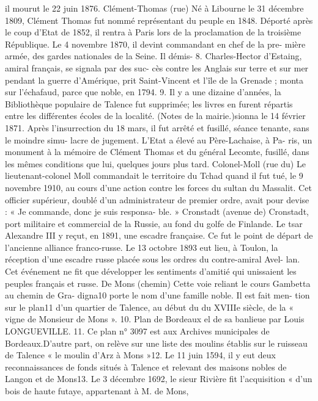 \documentclass[a4paper,11pt]{book}
\begin{document}
il mourut le 22 juin
1876.
Clément-Thomas (rue)
Né à Libourne le 31 décembre 1809, Clément Thomas fut
nommé représentant du peuple en 1848.
Déporté après le coup d'Etat de 1852, il rentra à Paris
lors de la proclamation de la troisième République. Le
4 novembre 1870, il devint commandant en chef de la pre-
mière armée, des gardes nationales de la Seine. Il démis-
8. Charles-Hector d'Estaing, amiral français, se signala par des suc-
cès contre les Anglais sur terre et sur mer pendant la guerre d'Amérique,
prit Saint-Vincent et l'île de la Grenade ; monta sur l'échafaud, parce que
noble, en 1794.
9. Il y a une dizaine d'années, la Bibliothèque populaire de Talence
fut supprimée; les livres en furent répartis entre les différentes écoles de
la localité. (Notes de la mairie.)sionna le 14 février 1871. Après l'insurrection du 18 mars,
il fut arrêté et fusillé, séance tenante, sans le moindre simu-
lacre de jugement. L'Etat a élevé au Père-Lachaise, à Pa-
ris, un monument à la mémoire de Clément Thomas et du
général Lecomte, fusillé, dans les mêmes conditions que
lui, quelques jours plus tard.
Colonel-Moll (rue du)
Le lieutenant-colonel Moll commandait le territoire du
Tchad quand il fut tué, le 9 novembre 1910, au cours d'une
action contre les forces du sultan du Massalit. Cet officier
supérieur, doublé d'un administrateur de premier ordre,
avait pour devise : « Je commande, donc je suis responsa-
ble. »
Cronstadt (avenue de)
Cronstadt, port militaire et commercial de la Russie, au
fond du golfe de Finlande. Le tsar Alexandre III y reçut,
en 1891, une escadre française. Ce fut le point de départ
de l'ancienne alliance franco-russe.
Le 13 octobre 1893 eut lieu, à Toulon, la réception d'une
escadre russe placée sous les ordres du contre-amiral Avel-
lan. Cet événement ne fit que développer les sentiments
d'amitié qui unissaient les peuples français et russe.
De Mons (chemin)
Cette voie reliant le cours Gambetta au chemin de Gra-
digna10 porte le nom d'une famille noble. Il est fait men-
tion sur le plan11 d'un quartier de Talence, au début du
du XVIIIe siècle, de la « vigne de Monsieur de Mons ».
10. Plan de Bordeaux el de sa banlieue par Louis LONGUEVILLE.
11. Ce plan n° 3097 est aux Archives municipales de Bordeaux.D'autre part, on relève sur une liste des moulins établis
sur le ruisseau de Talence « le moulin d'Arz à Mons »12.
Le 11 juin 1594, il y eut deux reconnaissances de fonds
situés à Talence et relevant des maisons nobles de Langon
et de Mons13.
Le 3 décembre 1692, le sieur Rivière fit l'acquisition
« d'un bois de haute futaye, appartenant à M. de Mons,
\end{document}
